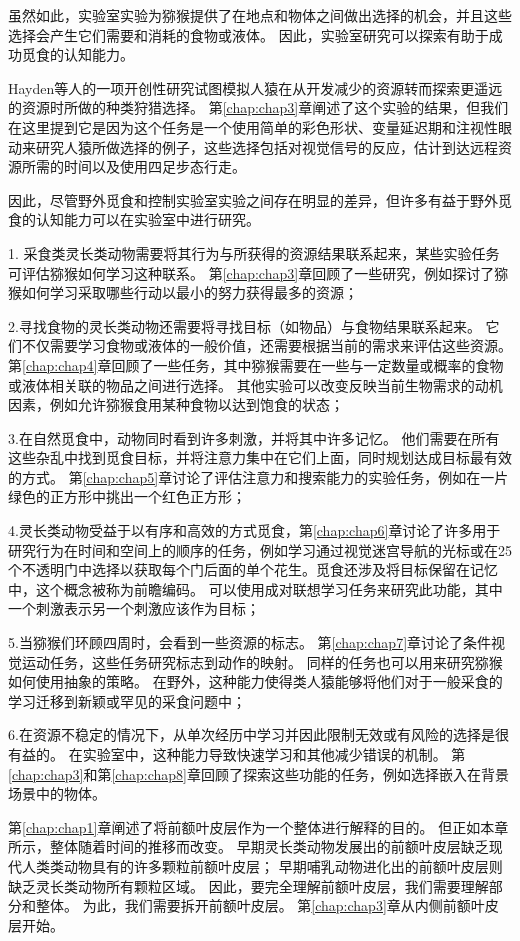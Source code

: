 虽然如此，实验室实验为猕猴提供了在地点和物体之间做出选择的机会，并且这些选择会产生它们需要和消耗的食物或液体。
因此，实验室研究可以探索有助于成功觅食的认知能力。


Hayden等人\cite{hayden2011surprise}的一项开创性研究试图模拟人猿在从开发减少的资源转而探索更遥远的资源时所做的种类狩猎选择。
第\ref{chap:chap3}章阐述了这个实验的结果，但我们在这里提到它是因为这个任务是一个使用简单的彩色形状、变量延迟期和注视性眼动来研究人猿所做选择的例子，这些选择包括对视觉信号的反应，估计到达远程资源所需的时间以及使用四足步态行走。


因此，尽管野外觅食和控制实验室实验之间存在明显的差异，但许多有益于野外觅食的认知能力可以在实验室中进行研究。


1. 采食类灵长类动物需要将其行为与所获得的资源结果联系起来，某些实验任务可评估猕猴如何学习这种联系。
第\ref{chap:chap3}章回顾了一些研究，例如探讨了猕猴如何学习采取哪些行动以最小的努力获得最多的资源；\par


2.寻找食物的灵长类动物还需要将寻找目标（如物品）与食物结果联系起来。
它们不仅需要学习食物或液体的一般价值，还需要根据当前的需求来评估这些资源。
第\ref{chap:chap4}章回顾了一些任务，其中猕猴需要在一些与一定数量或概率的食物或液体相关联的物品之间进行选择。
其他实验可以改变反映当前生物需求的动机因素，例如允许猕猴食用某种食物以达到饱食的状态；\par


3.在自然觅食中，动物同时看到许多刺激，并将其中许多记忆。
他们需要在所有这些杂乱中找到觅食目标，并将注意力集中在它们上面，同时规划达成目标最有效的方式。
第\ref{chap:chap5}章讨论了评估注意力和搜索能力的实验任务，例如在一片绿色的正方形中挑出一个红色正方形；\par


4.灵长类动物受益于以有序和高效的方式觅食，第\ref{chap:chap6}章讨论了许多用于研究行为在时间和空间上的顺序的任务，例如学习通过视觉迷宫导航的光标或在25个不透明门中选择以获取每个门后面的单个花生。觅食还涉及将目标保留在记忆中，这个概念被称为前瞻编码。
可以使用成对联想学习任务来研究此功能，其中一个刺激表示另一个刺激应该作为目标；\par


5.当猕猴们环顾四周时，会看到一些资源的标志。
第\ref{chap:chap7}章讨论了条件视觉运动任务，这些任务研究标志到动作的映射。
同样的任务也可以用来研究猕猴如何使用抽象的策略。
在野外，这种能力使得类人猿能够将他们对于一般采食的学习迁移到新颖或罕见的采食问题中；\par


6.在资源不稳定的情况下，从单次经历中学习并因此限制无效或有风险的选择是很有益的。
在实验室中，这种能力导致快速学习和其他减少错误的机制。
第\ref{chap:chap3}和第\ref{chap:chap8}章回顾了探索这些功能的任务，例如选择嵌入在背景场景中的物体。


第\ref{chap:chap1}章阐述了将前额叶皮层作为一个整体进行解释的目的。
但正如本章所示，整体随着时间的推移而改变。
早期灵长类动物发展出的前额叶皮层缺乏现代人类类动物具有的许多颗粒前额叶皮层；
早期哺乳动物进化出的前额叶皮层则缺乏灵长类动物所有颗粒区域。
因此，要完全理解前额叶皮层，我们需要理解部分和整体。
为此，我们需要拆开前额叶皮层。
第\ref{chap:chap3}章从内侧前额叶皮层开始。

